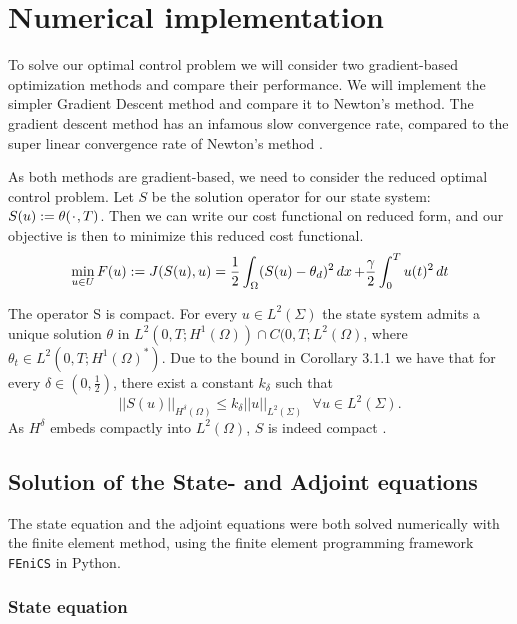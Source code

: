 
\section{Numerical implementation}

To solve our optimal control problem we will consider two gradient-based optimization methods and compare their performance. We will implement the simpler Gradient Descent method and compare it to Newton's method. The gradient descent method has an infamous slow convergence rate, compared to the super linear convergence rate of Newton's method \cite{Algorithms}.

As both methods are gradient-based, we need to consider the reduced optimal control problem. Let $S$ be the solution operator for our state system:  $S(u):=\theta(\placeholder ,T)$. Then we can write our cost functional on reduced form, and our objective is then to minimize this reduced cost functional.
\begin{equation}
\label{eq:optimization_prob}
    \min_{u \in U}F(u) := J(S(u),u) = \frac{1}{2}\int_{\Omega}(S(u) - \theta_d)^2 \mathop{dx}+ \frac{\gamma}{2}\int_0^Tu(t)^2\mathop{dt}
\end{equation}

The operator S is compact. For every $u \in L^2(\Sigma)$ the state system admits a unique solution $\theta \text{ in } L^2(0,T;H^1(\Omega)) \cap C(0,T;L^2(\Omega)$, where $\theta_t \in L^2(0,T;H^1(\Omega)^{*})$. Due to the bound in Corollary 3.1.1 we have that for every $\delta \in (0,\frac{1}{2})$, there exist a constant $k_{\delta}$ such that 
\begin{equation*}
    ||S(u)||_{H^{\delta}(\Omega)} \leq k_{\delta}||u||_{L^2(\Sigma)} \text{ } \forall u \in L^2(\Sigma).
\end{equation*}
As $H^{\delta}$ embeds compactly into $L^2(\Omega)$, $S$ is indeed compact \cite{primal_dual}. 


\subsection{Solution of the State- and Adjoint equations}

The state equation and the adjoint equations were both solved numerically with the finite element method, using the finite element programming framework \verb|FEniCS| \cite{fenics} in Python.


\subsubsection{State equation}

